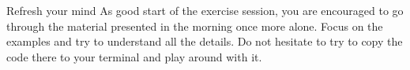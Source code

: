 
\begin{exercise}[Study]{Refresh your mind}
    As good start of the exercise session, you are encouraged to go through the material presented in the morning once more alone.
    Focus on the examples and try to understand all the details.
    Do not hesitate to try to copy the code there to your terminal and play around with it.
\end{exercise}
